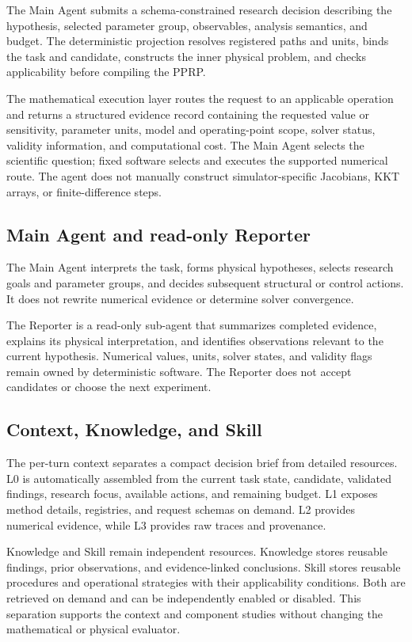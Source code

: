 The Main Agent submits a schema-constrained research decision describing the hypothesis, selected parameter group, observables, analysis semantics, and budget. The deterministic projection resolves registered paths and units, binds the task and candidate, constructs the inner physical problem, and checks applicability before compiling the PPRP.

The mathematical execution layer routes the request to an applicable operation and returns a structured evidence record containing the requested value or sensitivity, parameter units, model and operating-point scope, solver status, validity information, and computational cost. The Main Agent selects the scientific question; fixed software selects and executes the supported numerical route. The agent does not manually construct simulator-specific Jacobians, KKT arrays, or finite-difference steps.

\subsection{Main Agent and read-only Reporter}

The Main Agent interprets the task, forms physical hypotheses, selects research goals and parameter groups, and decides subsequent structural or control actions. It does not rewrite numerical evidence or determine solver convergence.

The Reporter is a read-only sub-agent that summarizes completed evidence, explains its physical interpretation, and identifies observations relevant to the current hypothesis. Numerical values, units, solver states, and validity flags remain owned by deterministic software. The Reporter does not accept candidates or choose the next experiment.

\subsection{Context, Knowledge, and Skill}

The per-turn context separates a compact decision brief from detailed resources. L0 is automatically assembled from the current task state, candidate, validated findings, research focus, available actions, and remaining budget. L1 exposes method details, registries, and request schemas on demand. L2 provides numerical evidence, while L3 provides raw traces and provenance.

Knowledge and Skill remain independent resources. Knowledge stores reusable findings, prior observations, and evidence-linked conclusions. Skill stores reusable procedures and operational strategies with their applicability conditions. Both are retrieved on demand and can be independently enabled or disabled. This separation supports the context and component studies without changing the mathematical or physical evaluator.

